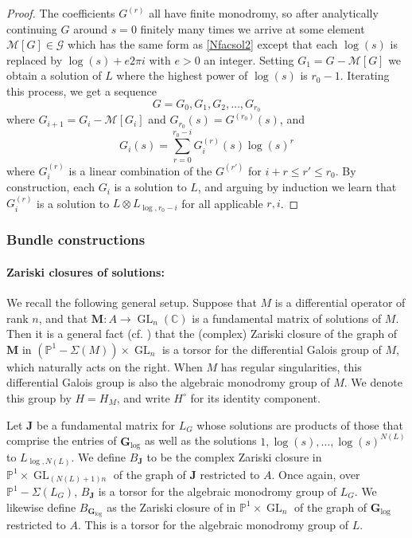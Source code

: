 \documentclass[10pt]{article}
\numberwithin{equation}{section}
\theoremstyle{plain}
\theoremstyle{definition}
\theoremstyle{remark}
\newcommand{\GL}{\operatorname{GL}}
\begin{document}
\begin{proof}
The coefficients $G^{(r)}$ all have finite monodromy, so after analytically continuing $G$ around $s = 0$ finitely many times we arrive at some element $\mathcal{M}[G] \in \mathcal{G}$ which has the same form as \eqref{Nfacsol2} except that each $\log(s)$ is replaced by $\log(s) + e 2 \pi i$ with $e > 0$ an integer. Setting $G_{1} = G - \mathcal{M}[G]$ we obtain a solution of $L$ where the highest power of $\log(s)$ is $r_{0} - 1$. Iterating this process, we get a sequence
\[ G = G_{0}, G_{1}, G_{2}, \hdots, G_{r_{0}} \]
where $G_{i+1} = G_{i} - \mathcal{M}[G_{i}]$ and $G_{r_{0}}(s) = G^{(r_0)}(s)$, and
\[ G_{i}(s) = \sum_{r = 0}^{r_{0} - i} G^{(r)}_{i}(s) \log(s)^r \]
where $G^{(r)}_{i}$ is a linear combination of the $G^{(r')}$ for $i + r \leq r' \leq r_0$. By construction, each $G_{i}$ is a solution to $L$, and arguing by induction we learn that $G^{(r)}_{i}$ is a solution to $L \otimes L_{\operatorname{log}, r_{0} - i}$ for all applicable $r, i$.
\end{proof}


\subsubsection{Bundle constructions} 
\label{bundconstrsec}

\paragraph{Zariski closures of solutions:} We recall the following general setup. Suppose that $M$ is a differential operator of rank $n$, and that $\mathbf{M} : A \to \GL_{n}(\mathbb{C})$ is a fundamental matrix of solutions of $M$. Then it is a general fact (cf. \cite[Ch 1, Thm. 1.28]{zbMATH01860838}) that the (complex) Zariski closure of the graph of $\mathbf{M}$ in $(\mathbb{P}^1 - \Sigma(M)) \times \GL_{n}$ is a torsor for the differential Galois group of $M$, which naturally acts on the right. When $M$ has regular singularities, this differential Galois group is also the algebraic monodromy group of $M$. We denote this group by $H = H_{M}$, and write $H^{\circ}$ for its identity component.

Let $\mathbf{J}$ be a fundamental matrix for $L_{G}$ whose solutions are products of those that comprise the entries of $\mathbf{G}_{\operatorname{log}}$ as well as the solutions $1, \log(s), \hdots, \log(s)^{N(L)}$ to $L_{\operatorname{log}, N(L)}$. We define $B_{\mathbf{J}}$ to be the complex Zariski closure in $\mathbb{P}^1 \times \GL_{(N(L) + 1) n}$ of the graph of $\mathbf{J}$ restricted to $A$. Once again, over $\mathbb{P}^1 - \Sigma(L_{G})$, $B_{\mathbf{J}}$ is a torsor for the algebraic monodromy group of $L_{G}$. We likewise define $B_{\mathbf{G}_{\operatorname{log}}}$ as the Zariski closure of in $\mathbb{P}^1 \times \GL_{n}$ of the graph of $\mathbf{G}_{\operatorname{log}}$ restricted to $A$. This is a torsor for the algebraic monodromy group of $L$.%
\end{document}
